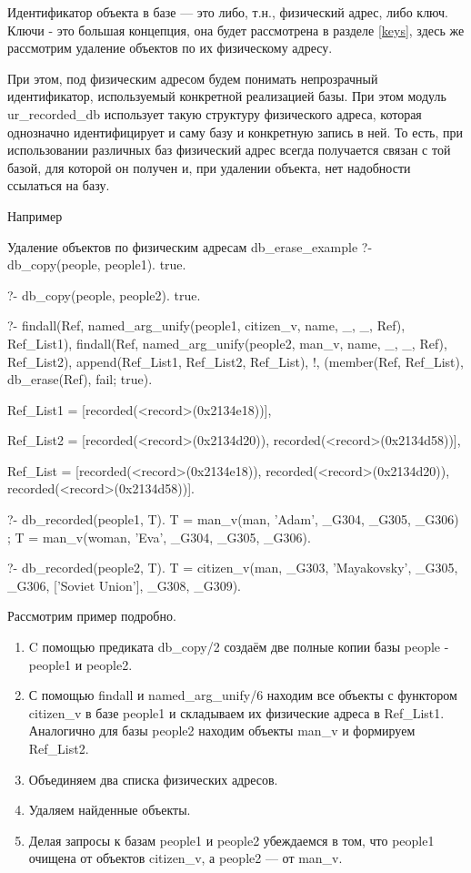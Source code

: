 \documentclass[a4paper]{book}
\def\tn{т.\thinspace н.}
\begin{document}
Идентификатор объекта в базе --- это либо, \tn, физический адрес,
либо ключ. Ключи - это большая концепция, она будет рассмотрена в
разделе \ref{keys}, здесь же рассмотрим удаление объектов по их
физическому адресу.

При этом, под физическим адресом будем понимать непрозрачный
идентификатор, используемый конкретной реализацией базы. При этом
модуль ur_recorded_db использует такую структуру физического
адреса, которая однозначно идентифицирует и саму базу и
конкретную запись в ней. То есть, при использовании различных баз
физический адрес всегда получается связан с той базой, для
которой он получен и, при удалении объекта, нет надобности
ссылаться на базу.

Например

\begin{bigexample}{Удаление объектов по физическим адресам}%
               {db_erase_example}
?- db_copy(people, people1).
true.

?- db_copy(people, people2).
true.

?- findall(Ref, 
           named_arg_unify(people1, citizen_v, name, _, _, Ref), 
           Ref_List1), 
   findall(Ref, 
           named_arg_unify(people2, man_v, name, _, _, Ref), 
           Ref_List2), 
   append(Ref_List1, Ref_List2, Ref_List), 
   !, 
   (member(Ref, Ref_List), db_erase(Ref), fail; true).

Ref_List1 = [recorded(<record>(0x2134e18))],

Ref_List2 = [recorded(<record>(0x2134d20)), 
             recorded(<record>(0x2134d58))],

Ref_List = [recorded(<record>(0x2134e18)), 
            recorded(<record>(0x2134d20)), 
            recorded(<record>(0x2134d58))].

?- db_recorded(people1, T).
T = man_v(man, 'Adam', _G304, _G305, _G306) ;
T = man_v(woman, 'Eva', _G304, _G305, _G306).

?- db_recorded(people2, T).                                        
T = citizen_v(man, _G303, 'Mayakovsky', _G305, _G306, 
              ['Soviet Union'], _G308, _G309).
\end{bigexample}

Рассмотрим пример подробно.

\begin{enumerate}
\item C помощью предиката db_copy/2 создаём две полные копии базы
  people - people1 и people2.
\item С помощью findall и named_arg_unify/6 находим все объекты
  с функтором citizen_v в базе people1 и складываем их
  физические адреса в Ref_List1. Аналогично для базы people2
  находим объекты man_v и формируем Ref_List2.
\item Объединяем два списка физических адресов.
\item Удаляем найденные объекты.
\item Делая запросы к базам people1 и people2 убеждаемся в том,
  что people1 очищена от объектов citizen_v, а people2 --- от
  man_v.
\end{enumerate}
\end{document}
